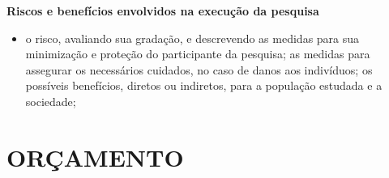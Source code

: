 \documentclass[
  brazilian,
  12pt,
  letterpaper,
  DIV=11,
  numbers=noendperiod]{scrartcl}
\providecommand{\tightlist}{%
  \setlength{\itemsep}{0pt}\setlength{\parskip}{0pt}}
\begin{document}
\textbf{Riscos e benefícios envolvidos na execução da pesquisa}

\begin{itemize}
\tightlist
\item
  o risco, avaliando sua gradação, e descrevendo as medidas para sua
  minimização e proteção do participante da pesquisa; as medidas para
  assegurar os necessários cuidados, no caso de danos aos indivíduos; os
  possíveis benefícios, diretos ou indiretos, para a população estudada
  e a sociedade;
\end{itemize}

\clearpage

\section{ORÇAMENTO}\label{oruxe7amento}
\end{document}

